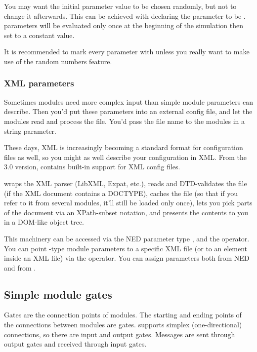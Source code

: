 You may want the initial parameter value to be chosen randomly, but not
to change it afterwards. This can be achieved with declaring the parameter
to be .  parameters will be evaluated only once
at the beginning of the simulation then set to a constant value.

It is recommended to mark every parameter with  unless
you really want to make use of the random numbers feature.


\subsubsection{XML parameters}

Sometimes modules need more complex input than simple module parameters
can describe. Then you'd put these parameters into an external config file,
and let the modules read and process the file. You'd pass the file name
to the modules in a string parameter.

These days, XML is increasingly becoming a standard format for configuration
files as well, so you might as well describe your configuration in XML.
From the 3.0 version, {\opp} contains built-in support for XML config files.

{\opp} wraps the XML parser (LibXML, Expat, etc.), reads and DTD-validates
the file (if the XML document contains a DOCTYPE), caches the file
(so that if you refer to it from several modules, it'll still be loaded
only once), lets you pick parts of the document via an XPath-subset notation,
and presents the contents to you in a DOM-like object tree.

This machinery can be accessed via the NED parameter type , and the
 operator. You can point -type module parameters
to a specific XML file (or to an element inside an XML file) via the
 operator. You can assign  parameters both from NED
and from .


\subsection{Simple module gates}
\label{sec:ch-ned-lang:simple-module-gates}


Gates are the connection points of modules. The starting and
ending points of the connections between modules are gates. {\opp}
supports simplex (one-directional) connections, so there are
input and output gates. Messages are sent through
output gates and received through input gates.


